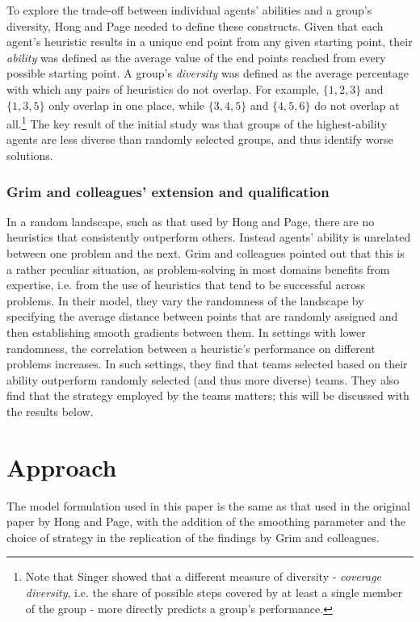 To explore the trade-off between individual agents' abilities and a group's diversity, Hong and Page needed to define these constructs. Given that each agent's heuristic results in a unique end point from any given starting point, their \emph{ability} was defined as the average value of the end points reached from every possible starting point. A group's \emph{diversity} was defined as the average percentage with which any pairs of heuristics do not overlap. For example, $\{1, 2, 3\}$ and $\{1, 3, 5\}$ only overlap in one place, while $\{3, 4, 5\}$ and $\{4, 5, 6\}$ do not overlap at all.\footnote{Note that Singer\supercite{singer2019diversity} showed that a different measure of diversity - \emph{coverage diversity}, i.e. the share of possible steps covered by at least a single member of the group - more directly predicts a group's performance.} The key result of the initial study was that groups of the highest-ability agents are less diverse than randomly selected groups, and thus identify worse solutions.

\subsubsection{Grim and colleagues' extension and qualification}

In a random landscape, such as that used by Hong and Page, there are no heuristics that consistently outperform others. Instead agents' ability is unrelated between one problem and the next. Grim and colleagues pointed out that this is a rather peculiar situation, as problem-solving in most domains benefits from expertise, i.e. from the use of heuristics that tend to be successful across problems. In their model, they vary the randomness of the landscape by specifying the average distance between points that are randomly assigned and then establishing smooth gradients between them. In settings with lower randomness, the correlation between a heuristic's performance on different problems increases. In such settings, they find that teams selected based on their ability outperform randomly selected (and thus more diverse) teams. They also find that the strategy employed by the teams matters; this will be discussed with the results below.

\section{Approach}

The model formulation used in this paper is the same as that used in the original paper by Hong and Page, with the addition of the smoothing parameter and the choice of strategy in the replication of the findings by Grim and colleagues.

